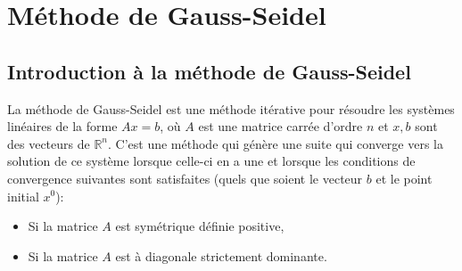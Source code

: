 




% 

\section{Méthode de Gauss-Seidel}
\subsection{Introduction à la méthode de Gauss-Seidel}
La méthode de Gauss-Seidel est une méthode itérative pour résoudre 
les systèmes linéaires de la forme $Ax=b$, où $A$ est une matrice carrée d'ordre $n$ et $x, b$ sont des vecteurs de $\mathbb{R}^n$. 
C'est une méthode qui génère 
une suite qui converge vers la solution de ce système lorsque celle-ci en a une et lorsque les conditions de convergence suivantes sont satisfaites (quels que soient le vecteur $b$ et le point initial $x^0$):
\begin{itemize}
  \item Si la matrice $A$ est symétrique définie positive,
  \item Si la matrice $A$ est à diagonale strictement dominante.
\end{itemize}

